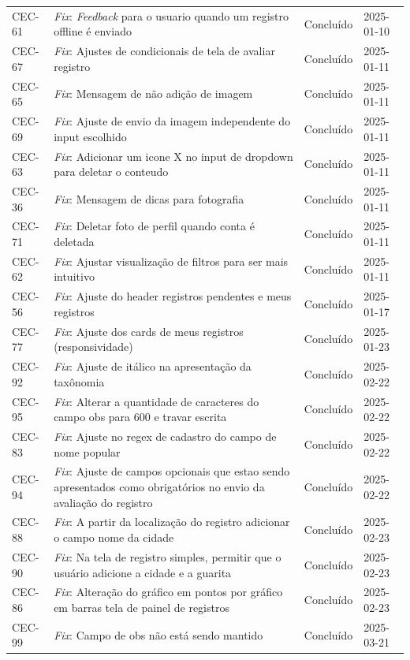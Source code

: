 \begin{longtable}{@{}lp{7cm}ll@{}}
CEC-61 & \textit{Fix}: \textit{Feedback} para o usuario quando um registro offline é enviado & Concluído & 2025-01-10 \\
CEC-67 & \textit{Fix}: Ajustes de condicionais de tela de avaliar registro & Concluído & 2025-01-11 \\
CEC-65 & \textit{Fix}: Mensagem de não adição de imagem & Concluído & 2025-01-11 \\
CEC-69 & \textit{Fix}: Ajuste de envio da imagem independente do input escolhido & Concluído & 2025-01-11 \\
CEC-63 & \textit{Fix}: Adicionar um icone X no input de dropdown para deletar o conteudo & Concluído & 2025-01-11 \\
CEC-36 & \textit{Fix}: Mensagem de dicas para fotografia & Concluído & 2025-01-11 \\
CEC-71 & \textit{Fix}: Deletar foto de perfil quando conta é deletada & Concluído & 2025-01-11 \\
CEC-62 & \textit{Fix}: Ajustar visualização de filtros para ser mais intuitivo & Concluído & 2025-01-11 \\
CEC-56 & \textit{Fix}: Ajuste do header registros pendentes e meus registros & Concluído & 2025-01-17 \\
CEC-77 & \textit{Fix}: Ajuste dos cards de meus registros (responsividade) & Concluído & 2025-01-23 \\
CEC-92 & \textit{Fix}: Ajuste de itálico na apresentação da taxônomia & Concluído & 2025-02-22 \\
CEC-95 & \textit{Fix}: Alterar a quantidade de caracteres do campo obs para 600 e travar escrita & Concluído & 2025-02-22 \\
CEC-83 & \textit{Fix}: Ajuste no regex de cadastro do campo de nome popular & Concluído & 2025-02-22 \\
CEC-94 & \textit{Fix}: Ajuste de campos opcionais que estao sendo apresentados como obrigatórios no envio da avaliação do registro & Concluído & 2025-02-22 \\
CEC-88 & \textit{Fix}: A partir da localização do registro adicionar o campo nome da cidade & Concluído & 2025-02-23 \\
CEC-90 & \textit{Fix}: Na tela de registro simples, permitir que o usuário adicione a cidade e a guarita & Concluído & 2025-02-23 \\
CEC-86 & \textit{Fix}: Alteração do gráfico em pontos por gráfico em barras tela de painel de registros & Concluído & 2025-02-23 \\
CEC-99 & \textit{Fix}: Campo de obs não está sendo mantido & Concluído & 2025-03-21 \\

\end{longtable}
